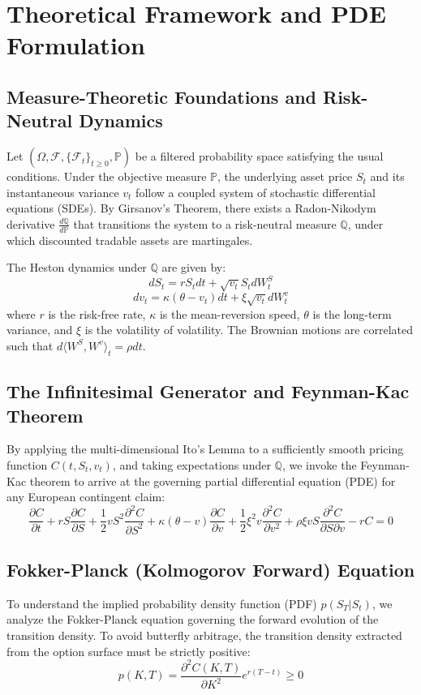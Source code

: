 \chapter{Theoretical Framework and PDE Formulation}
\section{Measure-Theoretic Foundations and Risk-Neutral Dynamics}
Let $(\Omega, \mathcal{F}, \{\mathcal{F}_t\}_{t \geq 0}, \mathbb{P})$ be a filtered probability space satisfying the usual conditions. Under the objective measure $\mathbb{P}$, the underlying asset price $S_t$ and its instantaneous variance $v_t$ follow a coupled system of stochastic differential equations (SDEs). By Girsanov's Theorem, there exists a Radon-Nikodym derivative $\frac{d\mathbb{Q}}{d\mathbb{P}}$ that transitions the system to a risk-neutral measure $\mathbb{Q}$, under which discounted tradable assets are martingales.

The Heston dynamics under $\mathbb{Q}$ are given by:
$$dS_t = r S_t dt + \sqrt{v_t} S_t dW_t^S$$
$$dv_t = \kappa(\theta - v_t)dt + \xi \sqrt{v_t} dW_t^v$$
where $r$ is the risk-free rate, $\kappa$ is the mean-reversion speed, $\theta$ is the long-term variance, and $\xi$ is the volatility of volatility. The Brownian motions are correlated such that $d\langle W^S, W^v \rangle_t = \rho dt$.

\section{The Infinitesimal Generator and Feynman-Kac Theorem}
By applying the multi-dimensional Ito's Lemma to a sufficiently smooth pricing function $C(t, S_t, v_t)$, and taking expectations under $\mathbb{Q}$, we invoke the Feynman-Kac theorem to arrive at the governing partial differential equation (PDE) for any European contingent claim:
$$\frac{\partial C}{\partial t} + r S \frac{\partial C}{\partial S} + \frac{1}{2} v S^2 \frac{\partial^2 C}{\partial S^2} + \kappa(\theta - v)\frac{\partial C}{\partial v} + \frac{1}{2} \xi^2 v \frac{\partial^2 C}{\partial v^2} + \rho \xi v S \frac{\partial^2 C}{\partial S \partial v} - rC = 0$$

\section{Fokker-Planck (Kolmogorov Forward) Equation}
To understand the implied probability density function (PDF) $p(S_T | S_t)$, we analyze the Fokker-Planck equation governing the forward evolution of the transition density. To avoid butterfly arbitrage, the transition density extracted from the option surface must be strictly positive:
$$p(K, T) = \frac{\partial^2 C(K,T)}{\partial K^2} e^{r(T-t)} \geq 0$$

